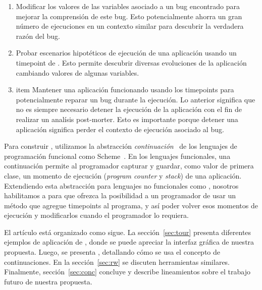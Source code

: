 \documentclass[conference]{IEEEtran}
\begin{document}
\begin{enumerate}
	
	\item Modificar los valores de las variables asociado a un bug encontrado para mejorar la comprensi\'on de este bug. Esto potencialmente ahorra un gran n\'umero de ejecuciones en un contexto similar para descubrir la verdadera raz\'on del bug.
	    

	\item Probar escenarios hipot\'eticos de ejecuci\'on de una aplicaci\'on usando un timepoint de \deloreanjs. Esto permite descubrir diversas evoluciones de la aplicaci\'on cambiando valores de algunas variables.   
	 
	\item item Mantener una aplicaci\'on funcionando usando los timepoints para potencialmente reparar un bug durante la ejecuci\'on. Lo anterior significa que no es siempre necesario detener la ejecuci\'on de la aplicaci\'on con el fin de realizar un anal\'isis post-morter. Esto es importante porque detener una aplicaci\'on significa perder el contexto de ejecuci\'on asociado al bug.  

\end{enumerate}

\smallskip

Para construir \deloreanjs, utilizamos la abstracci\'on {\em continuaci\'on}~\cite{fw84} de los lenguajes de programaci\'on funcional como Scheme~\cite{scheme48}. En los lenguajes funcionales, una continuaci\'on permite al programador capturar y guardar, como valor de primera clase, un momento de ejecuci\'on ({\em program counter} y {\em stack}) de una aplicaci\'on. Extendiendo esta abstracci\'on para lenguajes no funcionales como \javascript, nosotros habilitamos a \deloreanjs para que ofrezca la posibilidad a un programador de usar un m\'etodo que agregue timepoints al programa, y as\'i poder volver esos momentos de ejecuci\'on y modificarlos cuando el programador lo requiera.   


El art\'iculo est\'a organizado como sigue. La secci\'on~\ref{sec:tour} presenta diferentes ejemplos de aplicaci\'on de \deloreanjs, donde se puede apreciar la interfaz gr\'afica de nuestra propuesta. Luego, se presenta \deloreanjs, detallando c\'omo se usa el concepto de continuaciones. En la secci\'on~\ref{sec:rw} se discuten herramientas similares. Finalmente, secci\'on~\ref{sec:conc} concluye y describe lineamientos sobre el trabajo futuro de nuestra propuesta.      

\smallskip
\end{document}
